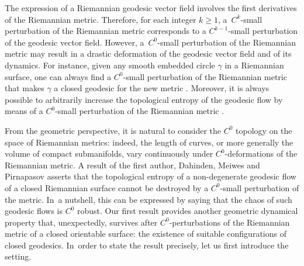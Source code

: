 \documentclass[11pt]{article}
\theoremstyle{plain}
\theoremstyle{definition}
\begin{document}
The expression of a Riemannian geodesic vector field involves the first derivatives of the Riemannian metric. Therefore, for each integer $k\geq1$, a~$C^k$-small perturbation of the Riemannian metric corresponds to a $C^{k-1}$-small perturbation of the geodesic vector field. However, a~$C^0$\nobreakdash-small perturbation of the Riemannian metric may result in a drastic deformation of the geodesic vector field and of its dynamics. For instance, given any smooth embedded circle $\gamma$ in a Riemannian surface, one can always find a $C^0$-small perturbation of the Riemannian metric that makes $\gamma$ a closed geodesic for the new metric \cite[Ex.\,43]{Alves:2022aa}. Moreover, it is always possible to arbitrarily increase the topological entropy of the geodesic flow by means of a $C^0$-small perturbation of the Riemannian metric \cite[Th.\,12]{Alves:2022aa}.

From the geometric perspective, it is natural to consider the $C^0$ topology on the space of Riemannian metrics: indeed, the length of curves, or more generally the volume of compact submanifolds, vary continuously under $C^0$-deformations of the Riemannian metric.
A result of the first author, Dahinden, Meiwes and Pirnapasov \cite{Alves:2023aa} asserts that the topological entropy of a non-degenerate geodesic flow of a closed Riemannian surface cannot be destroyed by a $C^0$-small perturbation of the metric. In~a nutshell, this can be expressed by saying that the chaos of such geodesic flows is $C^0$ robust.
Our first result provides another geometric dynamical property that, unexpectedly, survives after $C^0$-perturbations of the Riemannian metric of a closed orientable surface: the existence of suitable configurations of closed geodesics. In~order to state the result precisely, let us first introduce the setting.
\end{document}
